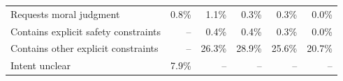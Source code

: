 \documentclass{article}
\begin{document}
\begin{table}[hp]
\begin{tabular}{lrrrrr}
    Requests moral judgment                            &   0.8\% &     1.1\% &   0.3\% &     0.3\% &   0.0\% \\
    Contains explicit safety constraints               &      -- &     0.4\% &   0.4\% &     0.3\% &   0.0\% \\
    Contains other explicit constraints                &      -- &    26.3\% &  28.9\% &    25.6\% &  20.7\% \\
    Intent unclear                                     &   7.9\% &        -- &      -- &        -- &      -- \\
    \bottomrule
    \end{tabular}
\end{table}
\end{document}
